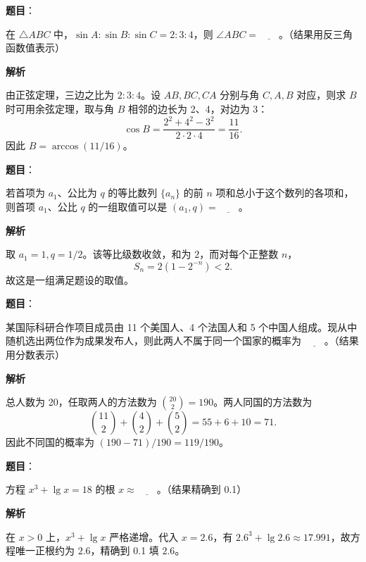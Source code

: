 \begin{answer}

\textbf{题目}：

在 \(\triangle ABC\) 中，\(\sin A:\sin B:\sin C=2:3:4\)，则 \(\angle ABC=\underline{\qquad}\)。（结果用反三角函数值表示）

\textbf{解析}

由正弦定理，三边之比为 \(2:3:4\)。设 \(AB,BC,CA\) 分别与角 \(C,A,B\) 对应，则求 \(B\) 时可用余弦定理，取与角 \(B\) 相邻的边长为 2、4，对边为 3：
\nopagebreak[4]
\[
\cos B=\frac{2^2+4^2-3^2}{2\cdot2\cdot4}=\frac{11}{16}.
\]
因此 \(B=\arccos(11/16)\)。


\end{answer}
\begin{answer}

\textbf{题目}：

若首项为 \(a_1\)、公比为 \(q\) 的等比数列 \(\{a_n\}\) 的前 \(n\) 项和总小于这个数列的各项和，则首项 \(a_1\)、公比 \(q\) 的一组取值可以是 \((a_1,q)=\underline{\qquad}\)。

\textbf{解析}

取 \(a_1=1,q=1/2\)。该等比级数收敛，和为 \(2\)，而对每个正整数 \(n\)，
\nopagebreak[4]
\[
S_n=2\left(1-2^{-n}\right)<2.
\]
故这是一组满足题设的取值。


\end{answer}
\begin{answer}

\textbf{题目}：

某国际科研合作项目成员由 11 个美国人、4 个法国人和 5 个中国人组成。现从中随机选出两位作为成果发布人，则此两人不属于同一个国家的概率为 \(\underline{\qquad}\)。（结果用分数表示）

\textbf{解析}

总人数为 20，任取两人的方法数为 \(\binom{20}{2}=190\)。两人同国的方法数为
\nopagebreak[4]
\[
\binom{11}{2}+\binom42+\binom52=55+6+10=71.
\]
因此不同国的概率为 \((190-71)/190=119/190\)。


\end{answer}
\begin{answer}

\textbf{题目}：

方程 \(x^3+\lg x=18\) 的根 \(x\approx\underline{\qquad}\)。（结果精确到 0.1）

\textbf{解析}

在 \(x>0\) 上，\(x^3+\lg x\) 严格递增。代入 \(x=2.6\)，有 \(2.6^3+\lg2.6\approx17.991\)，故方程唯一正根约为 \(2.6\)，精确到 0.1 填 \(2.6\)。


\end{answer}
